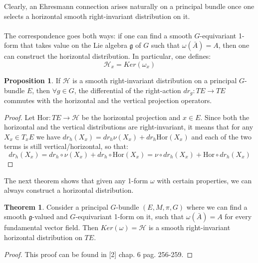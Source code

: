 \documentclass[12pt,a4paper]{report}
\theoremstyle{definition}
\theoremstyle{Theorem}
\newtheorem{Theo}[Def]{Theorem}
\newtheorem{Prop}[Def]{Proposition}
\theoremstyle{definition}
\theoremstyle{definition}
\begin{document}
	Clearly, an Ehresmann connection arises naturally on a principal bundle once one selects a horizontal smooth right-invariant distribution on it.\\
	\\
	The correspondence goes both ways: if one can find a smooth $G$-equivariant 1-form that takes value on the Lie algebra $\mathfrak{g}$ of $G$ such that $\omega(\bar{A})=A$, then one can construct the horizontal distribution. In particular, one defines: $$\mathcal{H}_{x}=Ker(\omega_{x})$$
	\begin{Prop}\label{Prop_5.3.1}
		If $\mathcal{H}$ is a smooth right-invariant distribution on a principal $G$-bundle $E$, then $\forall g\in G$, the differential of the right-action $dr_g:TE\rightarrow TE$ commutes with the horizontal and the vertical projection operators.
	\end{Prop}
	\begin{proof}
		Let $\mathrm{Hor}:TE\rightarrow\mathcal{H}$ be the horizontal projection and $x\in E$. Since both the horizontal and the vertical distributions are right-invariant, it means that for any $X_{x}\in T_xE$ we have $dr_h( X_{x})=dr_h \nu(X_{x})+dr_h\mathrm{Hor}(X_{x})$ and each of the two terms is still vertical/horizontal, so that:
		$$dr_h (X_{x})=dr_h\circ \nu(X_{x})+dr_h\circ \mathrm{Hor}(X_{x})=
		\nu\circ dr_h(X_{x})+\mathrm{Hor}\circ dr_h(X_{x})$$
	\end{proof}
	The next theorem shows that given any 1-form $\omega$ with certain properties, we can always construct a horizontal distribution.
	\begin{Theo}
		Consider a principal $G$-bundle $(E,M,\pi,G)$ where we can find a smooth $\mathfrak{g}$-valued and $G$-equivariant 1-form on it, such that $\omega(\bar{A})=A$ for every fundamental vector field. Then $Ker(\omega)=\mathcal{H}$ is a smooth right-invariant horizontal distribution on $TE$.
	\end{Theo}
	\begin{proof}
		This proof can be found in [2] chap. 6 pag. 256-259.
	\end{proof}
\end{document}
